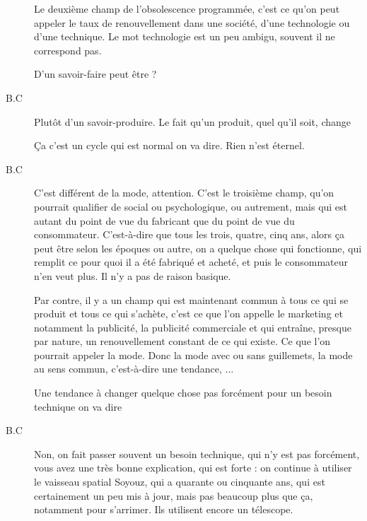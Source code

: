 \begin{description}
Le deuxième champ de l'obsolescence programmée, c'est ce qu'on peut appeler le taux de renouvellement dans une société, d'une technologie ou d'une technique. Le mot technologie est un peu ambigu, souvent il ne correspond pas.

D'un savoir-faire peut être ?

\item[B.C] Plutôt d'un savoir-produire. Le fait qu'un produit, quel qu'il soit, change

Ça c'est un cycle qui est normal on va dire. Rien n'est éternel.

\vspace{1\baselineskip}

\item[B.C]C'est différent de la mode, attention. C'est le troisième champ, qu'on pourrait qualifier de social ou psychologique, ou autrement, mais qui est autant du point de vue du fabricant que du point de vue du consommateur. C'est-à-dire que tous les trois, quatre, cinq ans, alors ça peut être selon les époques ou autre, on a quelque chose qui fonctionne, qui remplit ce pour quoi il a été fabriqué et acheté, et puis le consommateur n'en veut plus. Il n'y a pas de raison basique.

Par contre, il y a un champ qui est maintenant commun à tous ce qui se produit et tous ce qui s'achète, c'est ce que l'on appelle le marketing et notamment la publicité, la publicité commerciale et qui entraîne, presque par nature, un renouvellement constant de ce qui existe. Ce que l'on pourrait appeler la mode. Donc la mode avec ou sans guillemets, la mode au sens commun, c'est-à-dire une tendance, ...


\vspace{1\baselineskip}

Une tendance à changer quelque chose pas forcément pour un besoin technique on va dire


\vspace{1\baselineskip}

\item[B.C]Non, on fait passer souvent un besoin technique, qui n'y est pas forcément, vous avez une très bonne explication, qui est forte : on continue à utiliser le vaisseau spatial Soyouz, qui a quarante ou cinquante ans, qui est certainement un peu mis à jour, mais pas beaucoup plus que ça, notamment pour s'arrimer. Ils utilisent encore un télescope.

\vspace{1\baselineskip}


\end{description}
